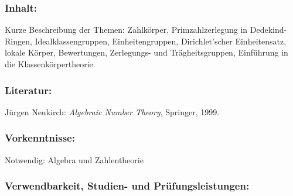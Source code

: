 \documentclass[a4paper,10pt]{article}
\begin{document}
\subsubsection*{\large
    Inhalt:
}
Kurze Beschreibung der Themen: Zahlkörper, Primzahlzerlegung in Dedekind-Ringen, Idealklassengruppen, Einheitengruppen, Dirichlet'scher Einheitensatz, lokale Körper, Bewertungen, Zerlegungs- und Trägheitsgruppen, Einführung in die Klassenkörpertheorie.  
\subsubsection*{\large
    Literatur:
}
Jürgen Neukirch: \emph{Algebraic Number Theory}, Springer, 1999.
\subsubsection*{\large
    Vorkenntnisse:
}
Notwendig: Algebra und Zahlentheorie
\cleardoublepage
\subsubsection*{\large
    Verwendbarkeit, Studien- und Prüfungsleistungen:
}
\end{document}
